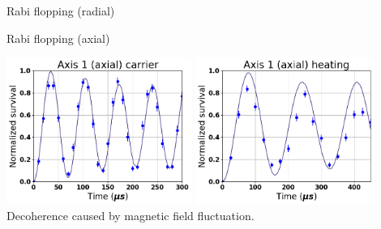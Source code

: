 \documentclass{beamer}
\begin{document}
\begin{frame}{Rabi flopping (radial)}
  \begin{center}
  \end{center}
\end{frame}

\begin{frame}{Rabi flopping (axial)}
  \begin{center}
    \includegraphics[height=4.8cm]{../../experiments/rabi_flop/imgs/fit_20170409_a1_0_nol.png}
    \includegraphics[height=4.8cm]{../../experiments/rabi_flop/imgs/fit_20170409_a1_p1_nol.png}\\
    Decoherence caused by magnetic field fluctuation.
  \end{center}
\end{frame}
\end{document}
